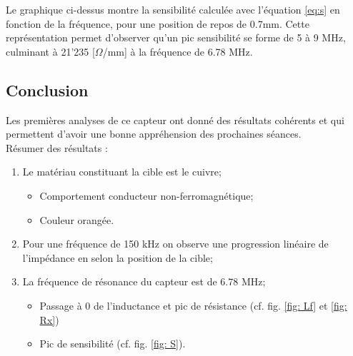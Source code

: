 
Le graphique ci-dessus montre la sensibilité calculée avec l'équation \ref{eq:s} en fonction
de la fréquence, pour une position de repos de 0.7mm. Cette représentation permet d'observer
qu'un pic sensibilité se forme de 5 à 9 MHz, culminant à 21'235 [$\Omega$/mm] à la fréquence 
de 6.78 MHz. 

 
\subsection{Conclusion}

Les premières analyses de ce capteur ont donné des résultats cohérents et qui permettent
d'avoir une bonne appréhension des prochaines séances.\\

Résumer des résultats :

\begin{enumerate}
    \item Le matériau constituant la cible est le cuivre;
    \begin{itemize}
        \item Comportement conducteur non-ferromagnétique;
        \item Couleur orangée.
    \end{itemize}
    \item Pour une fréquence de 150 kHz on observe une progression linéaire de l'impédance en selon
    la position de la cible;
    \item La fréquence de résonance du capteur est de 6.78 MHz;
    \begin{itemize}
        \item Passage à 0 de l'inductance et pic de résistance (cf. fig. \ref{fig: Lf} et \ref{fig: Rx})
        \item Pic de sensibilité (cf. fig. \ref{fig: S}). 
    \end{itemize}
\end{enumerate}

